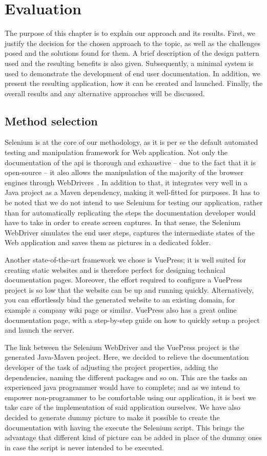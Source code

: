 \chapter{Evaluation}\label{ch:eval}
The purpose of this chapter is to explain our approach and its results. First, we justify the decision for the chosen approach to the topic, as well as the challenges posed and the solutions found for them. A brief description of the design pattern used and the resulting benefits is also given. Subsequently, a minimal system is used to demonstrate the development of end user documentation. In addition, we present the resulting application, how it can be created and launched. Finally, the overall results and any alternative approaches will be discussed.

\section{Method selection}\label{sec:meth}

Selenium is at the core of our methodology, as it is per se the default automated testing and manipulation framework for Web application. Not only the documentation of the \gls*{api} is thorough and exhaustive -- due to the fact that it is open-source -- it also allows the manipulation of the majority of the browser engines through WebDrivers~\cite{sel}. In addition to that, it integrates very well in a Java project  as a Maven dependency, making it well-fitted for purposes. It has to be noted that we do not intend to use Selenium for testing our application, rather than for automatically replicating the steps the documentation developer would have to take in order to create screen captures. In that sense, the Selenium WebDriver simulates the end user steps, captures the intermediate states of the Web application and saves them as pictures in a dedicated folder.

Another state-of-the-art framework we chose is VuePress; it is well suited for creating static websites and is therefore perfect for designing technical documentation pages. Moreover, the effort required to configure a VuePress project is so low that the website can be up and running quickly. Alternatively, you can effortlessly bind the generated website to an existing domain, for example a company wiki page or similar. VuePress also has a great online documentation page, with a step-by-step guide on how to quickly setup a project and launch the server.

The link between the Selenium WebDriver and the VuePress project is the generated Java-Maven project. Here, we decided to relieve the documentation developer of the task of adjusting the project properties, adding the dependencies, naming the different packages and so on. This are the tasks an experienced java programmer would have to complete; and as we intend to empower non-programmer to be comfortable using our application, it is best we take care of the implementation of said application ourselves. We have also decided to generate dummy picture to make it possible to create the documentation with having the execute the Selenium script. This brings the advantage that different kind of picture can be added in place of the dummy ones in case the script is never intended to be executed.

